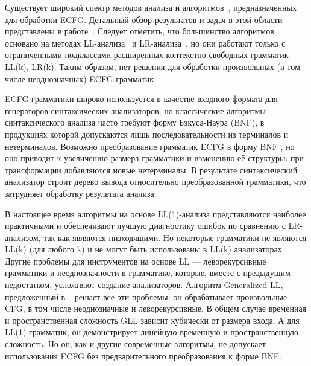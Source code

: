 Существует широкий спектр методов анализа и алгоритмов~\cite{AttributedELL,ELRR,
	ECFGparsing,ELLParser,ELL,ECFG,ELALR,ELRParsing}, предназначенных для обработки
ECFG. Детальный обзор результатов и задач в этой области представлены в работе~\cite{ECFG}.
Следует отметить, что большинство алгоритмов основано на методах
LL-анализа~\cite{ELLParser,AttributedELL,PredictiveECFG} и LR-анализа~\cite{ELRParsing,ELALR,ELRR},
но они работают только с ограниченными подклассами расширенных контекстно-свободных грамматик ---
LL(k), LR(k). Таким образом, нет решения для обработки произвольных (в том числе неоднозначных) ECFG-грамматик.

ECFG-грамматики широко используется в качестве входного формата для генераторов синтаксических анализаторов, 
но классические алгоритмы синтаксического анализа часто требуют форму Бэкуса-Наура (BNF),
в продукциях которой допускаются лишь последовательности из терминалов и нетерминалов.
Возможно преобразование грамматик ECFG в форму BNF \cite{ELL}, но оно приводит к увеличению
размера грамматики и изменению её структуры: при трансформации добавляются новые
нетерминалы. В результате синтаксический анализатор строит дерево вывода относительно
преобразованной грамматики, что затрудняет обработку результата анализа.

В настоящее время алгоритмы на основе LL(1)-анализа представляются
наиболее практичными и обеспечивают лучшую диагностику ошибок по сравнению с LR-анализом, так как являются низходящими. 
Но некоторые грамматики не являются LL(k) (для любого k) и не могут быть использованы в LL(k) анализаторах.
Другие проблемы для инструментов на основе LL --- леворекурсивные грамматики и неоднозначности в грамматике, 
которые, вместе с предыдущим недостатком, усложняют создание анализаторов. 
Алгоритм Generalized LL, предложенный в~\cite{scott2010gll}, решает 
все эти проблемы: он обрабатывает произвольные CFG, в том числе неоднозначные и леворекурсивные.
В общем случае временная и пространственная сложность GLL зависит кубически от 
размера входа. А для LL(1) грамматик, он демонстрирует линейную временную и
пространственную сложность. Но он, как и другие современные алгоритмы, не допускает использования ECFG 
без предварительного преобразования к форме BNF.

